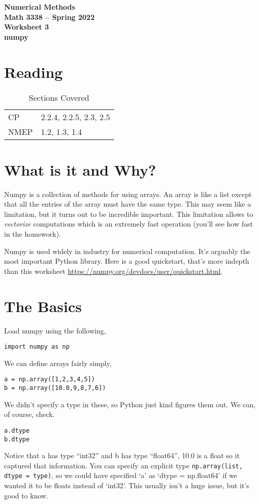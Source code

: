 \documentclass[11pt,letterpaper]{article}
\newcommand{\semester}{Spring 2022}
\begin{document}
\begin{center}
{\huge{\bf  Numerical Methods}} \\[1.5ex]
{\bf Math 3338 -- \semester}\\[1.5ex]
{\Large{\bf Worksheet 3\ \\[2ex] numpy}}\\
\end{center}
\vspace{2mm}

\section{Reading}

\begin{table}[!ht]
 \centering
 \begin{tabular}{ll}
   CP & 2.2.4, 2.2.5, 2.3, 2.5 \\
 NMEP &  1.2, 1.3, 1.4
 \end{tabular}
\caption{Sections Covered}
\end{table}

\section{What is it and Why?}
Numpy is a collection of methods for using arrays. An array is like a list except that all the entries of the array must have the same type. This may seem like a limitation, but it turns out to be incredible important. This limitation allows to \emph{vectorize} computations which is an extremely fast operation (you'll see how fast in the homework). 

Numpy is used widely in industry for numerical computation. It's arguably the most important Python library. Here is a good quickstart, that's more indepth than this worksheet \url{https://numpy.org/devdocs/user/quickstart.html}.


\section{The Basics}
Load numpy using the following,
\begin{verbatim}
import numpy as np
\end{verbatim}
We can define arrays fairly simply,
\begin{verbatim}
a = np.array([1,2,3,4,5])
b = np.array([10.0,9,8,7,6])
\end{verbatim}
We didn't specify a type in these, so Python just kind figures them out. We can, of course, check. 
\begin{verbatim}
a.dtype
b.dtype
\end{verbatim}
Notice that a has type ``int32'' and b has type ``float64'', 10.0 is a float so it captured that information. You can specify an explicit type \texttt{np.array(list, dtype = type)}, so we could have specified `a' as `dtype = np.float64' if we wanted it to be floats instead of `int32'. This usually isn't a huge issue, but it's good to know.
\end{document}
